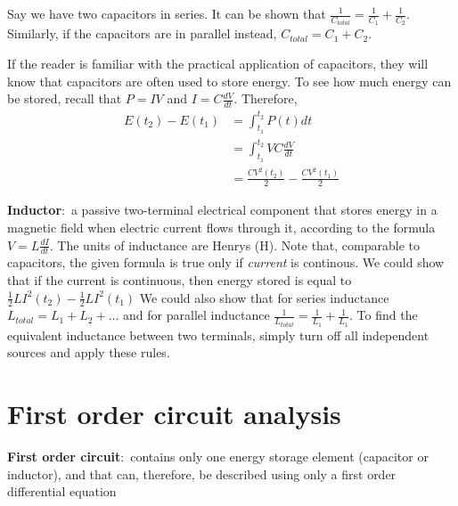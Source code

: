 \documentclass[nobib]{tufte-handout}
\newcommand{\defn}[2]{\noindent\textbf{#1}:\ #2}
\begin{document}
Say we have two capacitors in series. It can be shown that 
$\frac{1}{C_{total}} = \frac{1}{C_1} + \frac{1}{C_2}$. Similarly, if 
the capacitors are in parallel instead, $C_{total} = C_1 + C_2$. 

If the reader is familiar with the practical application of capacitors, 
they will know that capacitors are often used to store energy. To see how 
much energy can be stored, recall that $P = IV$ and $I = C\frac{dV}{dt}$. 
Therefore, 
\begin{align*}
    E(t_2)-E(t_1) &= \int_{t_1}^{t_2} P(t) dt \\
    &= \int_{t_1}^{t_2} VC\frac{dV}{dt} \\
    &= \frac{CV^2(t_2)}{2} - \frac{CV^2(t_1)}{2}
\end{align*}

\defn{Inductor}{a passive two-terminal electrical 
component that stores energy in a magnetic field when 
electric current flows through it, according to the 
formula $V = L\frac{dI}{dt}$}. The units of inductance are Henrys (H).
Note that, comparable to capacitors, the given formula is true 
only if \emph{current} is continous. We could show that if the 
current is continuous, then energy stored is equal to $\frac{1}{2}LI^2(t_2) - \frac{1}{2}LI^2(t_1)$
We could also show that for series inductance $L_{total} = L_1+L_2+\dots$
and for parallel inductance $\frac{1}{L_{total}} = \frac{1}{L_1} + \frac{1}{L_1}$. 
To find the equivalent inductance between two terminals, simply turn off all 
independent sources and apply these rules. 

\section{First order circuit analysis}

\defn{First order circuit}{contains only one energy storage element 
(capacitor or inductor), and that can, therefore, be described using 
only a first order differential equation}
\end{document}
